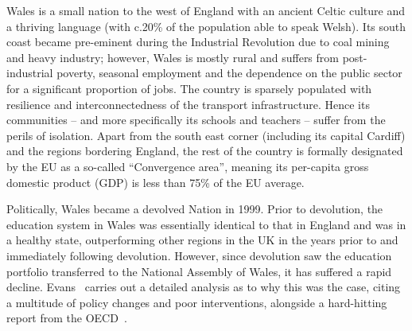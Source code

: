 \documentclass{sig-alternate}
\begin{document}
Wales is a small nation to the west of England with an ancient
Celtic culture and a thriving language (with c.20\% of the population
able to speak Welsh).  Its south coast became pre-eminent during the
Industrial Revolution due to coal mining and heavy industry; however,
Wales is mostly rural and suffers from post-industrial poverty,
seasonal employment and the dependence on the public sector for a
significant proportion of jobs. The country is sparsely populated with
resilience and interconnectedness of the transport infrastructure.
Hence its communities -- and more specifically its schools and
teachers -- suffer from the perils of isolation. Apart from the south
east corner (including its capital Cardiff)
and the regions bordering England, the rest of the country
is formally designated by the EU as a so-called ``Convergence area'',
meaning its per-capita gross domestic product (GDP) is less than 75\%
of the EU average.

Politically, Wales became a devolved Nation in 1999.
Prior to devolution, the education system in Wales was essentially
identical to that in England and was in a healthy state,
outperforming other regions in the UK in the years prior to and
immediately following devolution.  However, since devolution
saw the education portfolio transferred to the National Assembly of Wales,
it has suffered a rapid decline.
Evans~\cite{Evans:2015} carries out a detailed
analysis as to why this was the case, citing a multitude of policy
changes and poor interventions, alongside a
hard-hitting report from the OECD~\cite{oecdwales:2014}.

\end{document}
